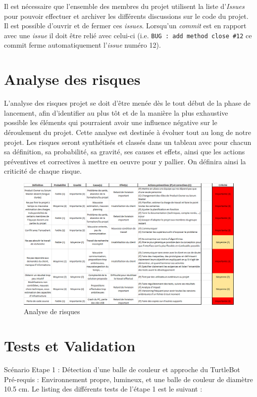 \documentclass[10pt,a4paper]{article}
\begin{document}
Il est nécessaire que l'ensemble des membres du projet utilisent la liste d'\textit{Issues} pour pouvoir effectuer et archiver les différents discussions sur le code du projet. Il est possible d'ouvrir et de fermer ces \textit{issues}. Lorsqu'un \textit{commit} est en rapport avec une \textit{issue} il doit être relié avec celui-ci (i.e. \verb|BUG : add method close #12| ce commit ferme automatiquement l'\textit{issue} numéro 12).


\section{Analyse des risques}
L’analyse des risques projet se doit d’être menée dès le tout début de la phase de lancement, afin d’identifier au plus tôt et de la manière la plus exhaustive possible les éléments qui pourraient avoir une influence négative sur le déroulement du projet. Cette analyse est destinée à évoluer tout au long de notre projet.
Les risques seront synthétisés et classés dans un tableau avec pour chacun sa définition, sa probabilité,
sa gravité, ses causes et effets, ainsi que les actions préventives et correctives à mettre en oeuvre pour y pallier. On définira ainsi la criticité de chaque risque.

\begin{figure}
  \centering
\noindent\includegraphics[width=13cm]{risques.png} 
  \caption{Analyse de risques}
\end{figure}

\section{Tests et Validation}
Scénario Etape 1 : Détection d'une balle de couleur et approche du TurtleBot
Pré-requis :  Environnement propre, lumineux,  et une balle de couleur de diamètre 10.5 cm.
Le listing des différents tests de l'étape 1 est le suivant :
\end{document}
